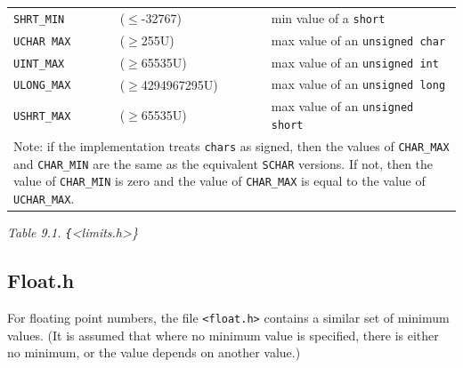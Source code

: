 \begin{tabular}{llp{\textwidth}}
     \texttt{SHRT\_MIN} & ($\leq$-32767) & min value of a \texttt{short}
    \\

     \texttt{UCHAR MAX} & ($\geq$255U) & max value of an \texttt{unsigned char}
    \\

     \texttt{UINT\_MAX} & ($\geq$65535U) & max value of an \texttt{unsigned int}
    \\

     \texttt{ULONG\_MAX} & ($\geq$4294967295U) & max value of an \texttt{unsigned long}
    \\

     \texttt{USHRT\_MAX} & ($\geq$65535U) & max value of an \texttt{unsigned short}
    \\
\multicolumn{3}{p{0.9\textwidth}}{Note: if the implementation treats \texttt{chars} as signed,
     then the values of \texttt{CHAR\_MAX} and \texttt{CHAR\_MIN} are
     the same as the equivalent \texttt{SCHAR} versions.  If not, then
     the value of \texttt{CHAR\_MIN} is zero and the value of
     \texttt{CHAR\_MAX} is equal to the value of
     \texttt{UCHAR\_MAX}.}\\
\end{tabular}

\begin{center}\textit{Table 9.1. \texttt\{<limits.h>\}}\end{center}


  

  \subsection{Float.h}
   

   For floating point numbers, the file \texttt{<float.h>}
    contains a similar set of minimum values.  (It is assumed that where no
    minimum value is specified, there is either no minimum, or
    the value depends on another value.)


